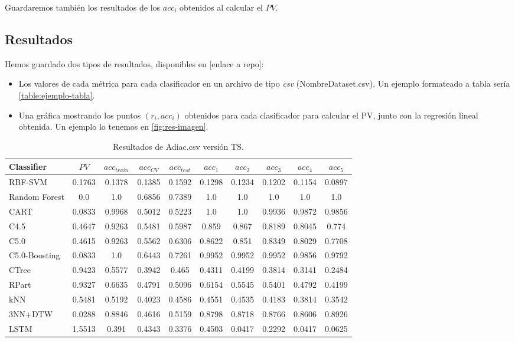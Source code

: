 Guardaremos también los resultados de los $acc_i$ obtenidos al calcular el $PV$.

\subsection{Resultados}

Hemos guardado dos tipos de resultados, disponibles en [enlace a repo]:

\begin{itemize}
  \item Los valores de cada métrica para cada clasificador en un archivo de tipo \emph{csv} (NombreDataset.csv). Un ejemplo formateado a tabla sería \autoref{table:ejemplo-tabla}.
  \item Una gráfica mostrando los puntos ${(r_i, acc_i)}$ obtenidos para cada clasificador para calcular el PV, junto con la regresión lineal obtenida. Un ejemplo lo tenemos en \autoref{fig:res-imagen}.
\end{itemize}

\begin{table}[htbp]
\centering
\hspace*{-0.9cm}
\begin{tabular}{||l | c c c c c c c c c||}
 \hline
 Classifier & $PV$ & $acc_{train}$ & $acc_{CV}$ & $acc_{test}$ & $acc_1$ & $acc_2$ & $acc_3$ & $acc_4$ & $acc_5$ \\ [0.5ex]
 \hline\hline
 RBF-SVM & 0.1763 & 0.1378 & 0.1385 & 0.1592 & 0.1298 & 0.1234 & 0.1202 & 0.1154 & 0.0897 \\
 Random Forest &0.0 & 1.0 & 0.6856 & 0.7389 & 1.0 & 1.0 & 1.0 & 1.0 & 1.0 \\
 CART & 0.0833 & 0.9968 & 0.5012 & 0.5223 & 1.0 & 1.0 & 0.9936 & 0.9872 & 0.9856 \\
 C4.5 & 0.4647 & 0.9263 & 0.5481 & 0.5987 & 0.859 & 0.867 & 0.8189 & 0.8045 & 0.774 \\
 C5.0 & 0.4615 & 0.9263 & 0.5562 & 0.6306 & 0.8622 & 0.851 & 0.8349 & 0.8029 & 0.7708 \\
 C5.0-Boosting & 0.0833 & 1.0 & 0.6443 & 0.7261 & 0.9952 & 0.9952 & 0.9952 & 0.9856 & 0.9792 \\
 CTree & 0.9423 & 0.5577 & 0.3942 & 0.465 & 0.4311 & 0.4199 & 0.3814 & 0.3141 & 0.2484 \\
 RPart & 0.9327 & 0.6635 & 0.4791 & 0.5096 & 0.6154 & 0.5545 & 0.5401 & 0.4792 & 0.4199 \\
 kNN & 0.5481 & 0.5192 & 0.4023 & 0.4586 & 0.4551 & 0.4535 & 0.4183 & 0.3814 & 0.3542 \\
 3NN+DTW & 0.0288 & 0.8846 & 0.4616 & 0.5159 & 0.8798 & 0.8718 & 0.8766 & 0.8606 & 0.8926 \\
 LSTM & 1.5513 & 0.391 & 0.4343 & 0.3376 & 0.4503 & 0.0417 & 0.2292 & 0.0417 & 0.0625 \\ [1ex]
 \hline
\end{tabular}
\caption{Resultados de Adiac.csv versión TS.}
\label{table:ejemplo-tabla}
\end{table}

